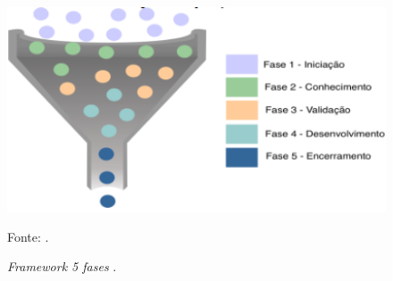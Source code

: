 \documentclass[
	12pt,				%
	openright,			%
	oneside,			%
	a4paper,			%
	english,			%
	french,				%
	spanish,			%
	brazil,				%
	]{abntex2}
\begin{document}
\begin{figure}[ht]
    \centering
    \caption{\textit{Framework 5 fases  }.}
    \includegraphics[width=4.8in]{Images/15Silva2021.png}
    \label{fig: silva21}
    
    \centering \small Fonte: .
\end{figure}
\end{document}
